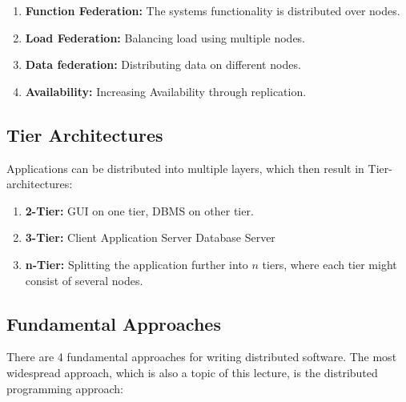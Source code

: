 \begin{enumerate}
    \item \textbf{Function Federation:} The systems functionality is distributed over nodes.
    \item \textbf{Load Federation:} Balancing load using multiple nodes.
    \item \textbf{Data federation:} Distributing data on different nodes.
    \item \textbf{Availability:} Increasing Availability through replication.
\end{enumerate}

\subsection{Tier Architectures}

Applications can be distributed into multiple layers, which then result in Tier-architectures:

\begin{enumerate}
    \item \textbf{2-Tier:} \ac{GUI} on one tier, DBMS on other tier.
    \item \textbf{3-Tier:} Client \textendash{} Application Server \textendash{} Database Server
    \item \textbf{n-Tier:} Splitting the application further into $n$ tiers, where each tier might consist of several nodes.
\end{enumerate}

\subsection{Fundamental Approaches}

There are 4 fundamental approaches for writing distributed software. The most widespread approach, which is also a topic of this lecture, is the distributed programming approach:

